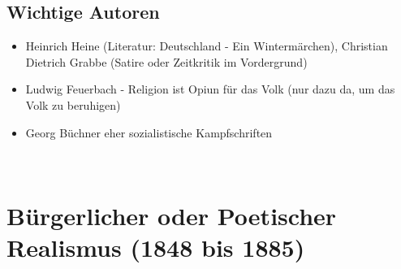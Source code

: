 \documentclass[12pt,a4paper]{article}
\begin{document}
\subsection{Wichtige Autoren}

	\begin{itemize}
	\item Heinrich Heine (Literatur: Deutschland - Ein Wintermärchen), Christian Dietrich Grabbe (Satire oder Zeitkritik im Vordergrund)
	\item Ludwig Feuerbach - Religion ist Opiun für das Volk (nur dazu da, um das Volk zu beruhigen)
	\item Georg Büchner eher sozialistische Kampfschriften
	\end{itemize}\

\newpage

\section{Bürgerlicher oder Poetischer Realismus (1848 bis 1885)}
\end{document}
